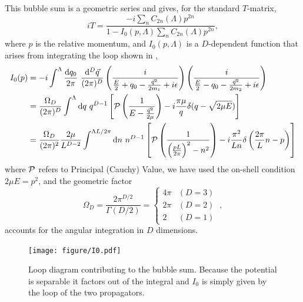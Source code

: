 This bubble sum is a geometric series and gives, for the standard $T$-matrix, \cite{Kaplan:1998we,Beane:2003da}
\begin{equation}\label{eq:T matrix}
iT = \frac{-i\sum_n C_{2n}(\Lambda) p^{2n}}{1-I_0(p,\Lambda) \sum_n C_{2n}(\Lambda) p^{2n}},
\end{equation}
where $p$ is the relative momentum,  and $I_0(p,\Lambda)$ is a $D$-dependent function that arises from integrating the loop shown in ,
\begin{align}
    I_0(p)
    &=-i\int^{\Lambda}
        \frac { \mathrm {d}q_0}{2\pi}\ \frac{\mathrm { d } ^ { D } \vec{ q } } { (2\pi)^ { D } }
        \left( \frac { i } { \frac{E}{2} + q _ { 0 } - \frac{\vec{q}^2}{2m_1} + i \epsilon } \right)
        \left( \frac { i } { \frac{E}{2} - q _ { 0 } - \frac{\vec{q}^2}{2m_2} + i \epsilon } \right)
    \label{eq:I0 in two particle language}\\
    &=\frac{\Omega_D}{(2\pi)^D}\int^{\Lambda}  \mathrm { d } q \ q^{D-1}\left[\PV \left( \frac { 1 } { E - \frac{\vec{q}^2}{2\mu} } \right)
-i\frac{\pi \mu}{q}\delta(q-\sqrt{2 \mu E})\right]
    \\
    &=\frac{\Omega_D}{(2\pi)^2}\frac{2\mu}{L^{D-2}}\int^{\Lambda L/2\pi}  \mathrm { d } n \ n^{D-1}\left[\PV \left( \frac { 1 } { \left(\frac{pL}{2\pi}\right)^2 - n^2 } \right)
-i\frac{\pi^2}{L n}\delta\left(\frac{2\pi}{L}n -p\right)\right]
    \label{eq:I0}
\end{align}
where $\mathcal{P}$ refers to Principal (Cauchy) Value, we have used the on-shell condition $2\mu E=p^2$, and the geometric factor
\begin{equation}
\Omega_D=\frac{2\pi^{D/2}}{\Gamma(D/2)}=
    \begin{cases}
        4\pi    &   (D=3)\\
        2\pi    &   (D=2)\\
        2       &   (D=1)
    \end{cases}\ ,
\end{equation}
accounts for the angular integration in $D$ dimensions.

\begin{figure}[h!]
    \center
    \texttt{[image: figure/I0.pdf]}
    \caption{
        Loop diagram contributing to the bubble sum.
        Because the potential is separable it factors out of the integral and $I_0$ is simply given by the loop of the two propagators.
    }
    \label{fig:I0}
\end{figure}

